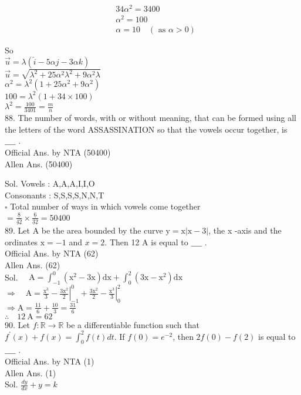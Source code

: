 \documentclass[10pt]{article}
\begin{document}
\[
\begin{aligned}
& 34 \alpha^{2}=3400 \\
& \alpha^{2}=100 \\
& \alpha=10 \quad(\text { as } \alpha>0)
\end{aligned}
\]

So\\
\(\vec{u}=\lambda(\hat{i}-5 \alpha j-3 \alpha k)\)\\
\(\vec{u}=\sqrt{\lambda^{2}+25 \alpha^{2} \lambda^{2}+9 \alpha^{2} \lambda}\)\\
\(\alpha^{2}=\lambda^{2}\left(1+25 \alpha^{2}+9 \alpha^{2}\right)\)\\
\(100=\lambda^{2}(1+34 \times 100)\)\\
\(\lambda^{2}=\frac{100}{3401}=\frac{m}{n}\)\\
88. The number of words, with or without meaning, that can be formed using all the letters of the word ASSASSINATION so that the vowels occur together, is \(\_\_\_\_\) .\\
Official Ans. by NTA (50400)\\
Allen Ans. (50400)

Sol. Vowels : A,A,A,I,I,O\\
Consonants : S,S,S,S,N,N,T\\
\(\square\) Total number of ways in which vowels come together\\
\(=\frac{\underline{8}}{\underline{4} \underline{2}} \times \frac{\underline{6}}{\underline{3} \underline{2}}=50400\)\\
89. Let A be the area bounded by the curve \(\mathrm{y}=\mathrm{x}|\mathrm{x}-3|\), the x -axis and the ordinates \(\mathrm{x}=-1\) and \(x=2\). Then 12 A is equal to \(\_\_\_\_\) .\\
Official Ans. by NTA (62)\\
Allen Ans. (62)\\
Sol. \(\quad \mathrm{A}=\int_{-1}^{0}\left(\mathrm{x}^{2}-3 \mathrm{x}\right) \mathrm{dx}+\int_{0}^{2}\left(3 \mathrm{x}-\mathrm{x}^{2}\right) \mathrm{dx}\)\\
\(\Rightarrow \quad \mathrm{A}=\frac{\mathrm{x}^{3}}{3}-\left.\frac{3 \mathrm{x}^{2}}{2}\right|_{-1} ^{0}+\frac{3 \mathrm{x}^{2}}{2}-\left.\frac{\mathrm{x}^{3}}{3}\right|_{0} ^{2}\)\\
\(\Rightarrow \mathrm{A}=\frac{11}{6}+\frac{10}{3}=\frac{31}{6}\)\\
\(\therefore \quad 12 \mathrm{~A}=62\)\\
90. Let \(f: \mathbb{R} \rightarrow \mathbb{R}\) be a differentiable function such that \(f^{\prime}(x)+f(x)=\int_{0}^{2} f(t) d t\). If \(f(0)=e^{-2}\), then \(2 f(0)-f(2)\) is equal to \(\_\_\_\_\) .\\
Official Ans. by NTA (1)\\
Allen Ans. (1)\\
Sol. \(\frac{d y}{d x}+y=k\)
\end{document}
